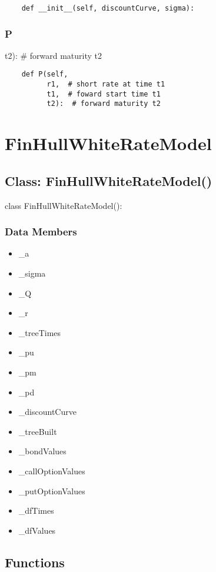 \documentclass[twoside,11pt]{book}
\begin{document}
\begin{lstlisting}
    def __init__(self, discountCurve, sigma):
\end{lstlisting}

\subsubsection*{{\bf P}}
t2):  \# forward maturity t2 

\begin{lstlisting}
    def P(self,
          r1,  # short rate at time t1
          t1,  # foward start time t1
          t2):  # forward maturity t2
\end{lstlisting}

\newpage
\section{FinHullWhiteRateModel}

\subsection*{Class: FinHullWhiteRateModel()}
class FinHullWhiteRateModel(): 

\subsubsection*{Data Members}
\begin{itemize}
\item{\_a}
\item{\_sigma}
\item{\_Q}
\item{\_r}
\item{\_treeTimes}
\item{\_pu}
\item{\_pm}
\item{\_pd}
\item{\_discountCurve}
\item{\_treeBuilt}
\item{\_bondValues}
\item{\_callOptionValues}
\item{\_putOptionValues}
\item{\_dfTimes}
\item{\_dfValues}
\end{itemize}

\subsection*{Functions}
\end{document}
